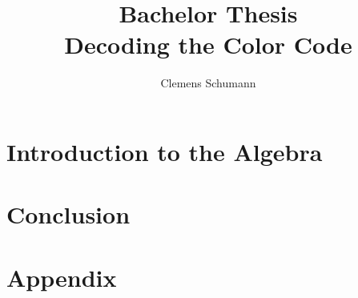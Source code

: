 \documentclass[12pt]{article}
\title{Bachelor Thesis\\ Decoding the Color Code}
\author{Clemens Schumann}
\begin{document}
\maketitle
\newpage
\tableofcontents
\newpage
%
\section{Introduction to the Algebra}

\newpage
\section{Conclusion}

\section{Appendix}

\newpage
%
%
\end{document}
